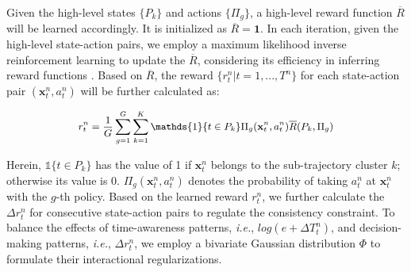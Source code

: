 \documentclass{article}
\begin{document}
Given the high-level states $\{P_{k}\}$ and actions $\{\Pi_{g}\}$, a high-level reward function $\overline{R}$ will be learned accordingly. It is initialized as $\overline{R} = \mathbf{1}$. In each iteration, given the high-level state-action pairs, we employ a maximum likelihood inverse reinforcement learning \cite{babes2011apprenticeship} to update the $\overline{R}$, considering its efficiency in inferring reward functions \cite{yang2020student}. Based on $\overline{R}$, the reward $\{r_{t}^{n}|t=1,..., T^{n}\}$ for each state-action pair $(\mathbf{x}_{t}^{n}, a_{t}^{n})$ will be further calculated as: 

\vspace{-0.3cm}
\begin{align} 
\small
    \begin{split}
    r_{t}^{n} = \frac{1}{G} \sum_{g=1}^{G} \sum_{k=1}^{K} \mathds{1}\{t \in P_k\} \Pi_g(\mathbf{x}_{t}^{n}, a_{t}^{n}) \overline{R}(P_k, \Pi_g)
    \label{eq:2.1.4}
    \end{split}
\end{align}

\noindent Herein, %
$\mathds{1}\{t \in P_k\}$ has the value of 1 if $\mathbf{x}_{t}^{n}$ belongs to the sub-trajectory cluster $k$; otherwise its value is 0. $\Pi_{g}(\mathbf{x}_{t}^{n}, a_{t}^{n})$ denotes the probability of taking $a_{t}^{n}$ at $\mathbf{x}_{t}^{n}$ with the $g$-th policy. 
Based on the learned reward $r_{t}^{n}$, we further calculate the $\Delta r^{n}_{t}$ for consecutive state-action pairs to regulate the consistency constraint. 
To balance the effects of time-awareness patterns, \textit{i.e.}, $log(e+\Delta T^{n}_{t})$, and decision-making patterns, \textit{i.e.}, $\Delta r^{n}_{t}$, we employ a bivariate Gaussian distribution $\Phi$ to formulate their interactional regularizations. 

\end{document}
